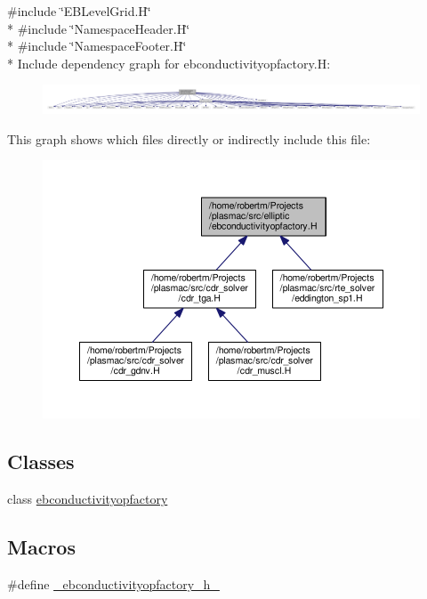 {\ttfamily \#include \char`\"{}E\+B\+Level\+Grid.\+H\char`\"{}}\\*
{\ttfamily \#include \char`\"{}Namespace\+Header.\+H\char`\"{}}\\*
{\ttfamily \#include \char`\"{}Namespace\+Footer.\+H\char`\"{}}\\*
Include dependency graph for ebconductivityopfactory.\+H\+:\nopagebreak
\begin{figure}[H]
\begin{center}
\leavevmode
\includegraphics[width=350pt]{ebconductivityopfactory_8H__incl}
\end{center}
\end{figure}
This graph shows which files directly or indirectly include this file\+:\nopagebreak
\begin{figure}[H]
\begin{center}
\leavevmode
\includegraphics[width=350pt]{ebconductivityopfactory_8H__dep__incl}
\end{center}
\end{figure}
\subsection*{Classes}
\begin{DoxyCompactItemize}
\item 
class \hyperlink{classebconductivityopfactory}{ebconductivityopfactory}
\end{DoxyCompactItemize}
\subsection*{Macros}
\begin{DoxyCompactItemize}
\item 
\#define \hyperlink{ebconductivityopfactory_8H_a92641a6e5f3761dfb893371cad712548}{\+\_\+ebconductivityopfactory\+\_\+h\+\_\+}
\end{DoxyCompactItemize}


